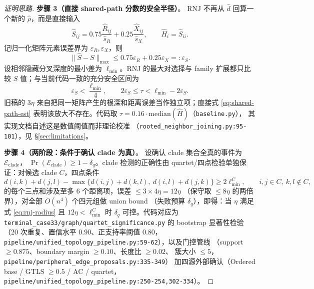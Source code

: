 \documentclass[UTF8,11pt]{ctexart}
\begin{document}
\begin{proof}[证明思路]
\textbf{步骤 3（直接 shared-path 分数的安全半径）}。
RNJ 不再从 $\hat d$ 回算一个新的 $\hat\rho$，而是直接输入
\begin{equation}
  \hat S_{ij}=0.75\frac{\widehat R_{ij}}{\hat s_R}
  +0.25\frac{\widehat X_{ij}}{\hat s_X},
  \qquad \hat H_i=\hat S_{ii}.
  \label{eq:shared-path-est}
\end{equation}
记归一化矩阵元素误差界为 $\varepsilon_R,\varepsilon_X$，则
\begin{equation}
  \|\hat S-S\|_{\max}
  \le0.75\varepsilon_R+0.25\varepsilon_X=: \varepsilon_S.
  \label{eq:three-eta}
\end{equation}
设相邻隐藏分叉深度的最小差为 $\ell_{\min}$。RNJ 的最大对选择与 family 扩展都只比较
$S$ 值；与当前代码一致的充分安全区间为
\begin{equation}
  \varepsilon_S<\frac{\ell_{\min}}4,
  \qquad
  2\varepsilon_S\le\tau<\ell_{\min}-2\varepsilon_S.
  \label{eq:rnj-radius}
\end{equation}
旧稿的 $3\eta$ 来自把同一矩阵产生的根深和距离误差当作独立项；直接式
\eqref{eq:shared-path-est} 表明该放大不存在。代码取
$\tau=0.16\cdot\mathrm{median}(\hat H)$（\texttt{baseline.py}），
其实现文档自述这是数值阈值而非理论校准
（\texttt{rooted\_neighbor\_joining.py:95-101}），见 \S\ref{sec:limitations}。

\textbf{步骤 4（两阶段：条件于确认 clade 为真）}。
设确认 clade 集合全真的事件为 $\mathcal{E}_{\mathrm{clade}}$，
$\Pr(\mathcal{E}_{\mathrm{clade}})\ge 1-\delta_q$。clade 检测的正确性由
quartet/四点检验单独保证：对候选 clade $C$，四点条件
\begin{equation}
  d(i,k)+d(j,l)-\max\bigl\{d(i,j)+d(k,l),\ d(i,l)+d(j,k)\bigr\}
  \ge 2\ell^C_{\min},
  \qquad i,j\in C,\ k,l\notin C,
  \label{eq:quartet-cond}
\end{equation}
的每个三点和涉及至多 $6$ 个距离项，误差 $\le 3\times 4\eta=12\eta$
（保守取 $\le 8\eta$ 的两倍界），对全部 $O(n^4)$ 个四元组做 union bound
（失败预算 $\delta_q$），即得：当 $\eta$ 满足式 \eqref{eq:rnj-radius} 且
$12\eta<\ell^C_{\min}$ 时 $\delta_q$ 可控。代码对应为
\texttt{terminal\_case33/graph/quartet\_significance.py} 的 bootstrap 显著性检验
（20 次重复、置信水平 $0.90$、正支持率阈值 $0.80$，
\texttt{pipeline/unified\_topology\_pipeline.py:59-62}），以及门控管线
（support $\ge 0.875$、boundary margin $\ge 0.10$、长度比 $\ge 0.02$、
簇大小 $\le 5$，\texttt{pipeline/peripheral\_edge\_proposals.py:335-349}）
加四源外部确认（Ordered base / GTLS $\ge 0.5$ / AC / quartet，
\texttt{pipeline/unified\_topology\_pipeline.py:250-254,302-334}）。


\end{proof}
\end{document}
